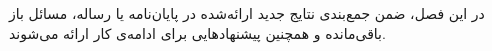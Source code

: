 
 \label{conclusion}

در این فصل، ضمن جمع‌بندی نتایج جدید ارائه‌شده در پایان‌نامه یا رساله، 
مسائل باز باقی‌مانده و همچنین پیشنهادهایی برای ادامه‌ی کار ارائه می‌شوند.
